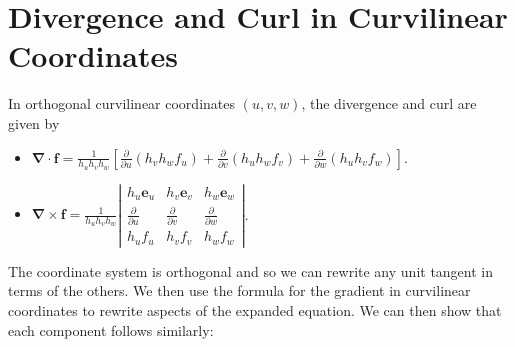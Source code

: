 \section{Divergence and Curl in Curvilinear Coordinates}

\begin{proposition}
  In orthogonal curvilinear coordinates \((u, v, w)\), the divergence and curl are given by
\begin{itemize}
\item[(i)] \(\boldsymbol{\nabla} \cdot \boldsymbol{f}=\frac{1}{h_u h_v h_w}\left[\frac{\partial}{\partial u}\left(h_v h_w f_u\right)+\frac{\partial}{\partial v}\left(h_u h_w f_v\right)+\frac{\partial}{\partial w}\left(h_u h_v f_w\right)\right]\).
\item[(ii)] \(\boldsymbol{\nabla} \times \boldsymbol{f}=\frac{1}{h_u h_v h_w}\left|\begin{array}{ccc}h_u \boldsymbol{e}_u & h_v \boldsymbol{e}_v & h_w \boldsymbol{e}_w \\ \frac{\partial}{\partial u} & \frac{\partial}{\partial v} & \frac{\partial}{\partial w} \\ h_u f_u & h_v f_v & h_w f_w\end{array}\right|\).
\end{itemize}
\end{proposition}

\begin{proofidea}
  
  The coordinate system is orthogonal and so we can rewrite any unit tangent in terms of the others. We then use the formula for the gradient in curvilinear coordinates to rewrite aspects of the expanded equation. We can then show that each component follows similarly:
  
\end{proofidea}
  

